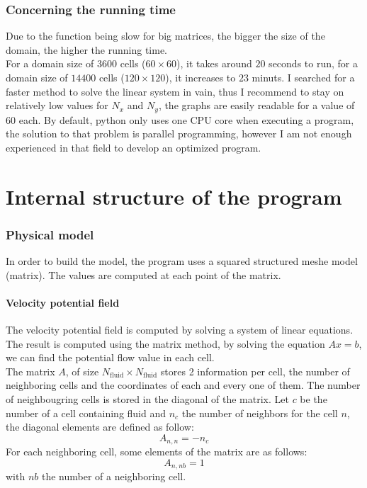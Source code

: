 \section{Concerning the running time}
Due to the function  being slow for
big matrices, the bigger the size of the domain, the higher the running time.\\
For a domain size of $\num{3600}$ cells ($\num{60} \times \num{60}$), it takes
around $\num{20}$ seconds to run, for a domain size of $\num{14400}$ cells
($\num{120} \times \num{120}$), it increases to $\num{23}$ minuts. 
\smallbreak{}
I searched for a faster method to solve the linear system in vain, thus I
recommend to stay on relatively low values for $N_x$ and $N_y$, the graphs are
easily readable for a value of $\num{60}$ each.
\smallbreak{}
By default, python only uses one CPU core when executing a program, the
solution to that problem is parallel programming, however I am not enough
experienced in that field to develop an optimized program.

\part{Internal structure of the program}
\section{Physical model}
In order to build the model, the program uses a squared structured meshe
model (matrix). The values are computed at each point of the matrix.

\subsection{Velocity potential field}
The velocity potential field is computed by solving a system of linear
equations. The result is computed using the matrix method, by solving the
equation $Ax = b$, we can find the potential flow value in each cell.\\
The matrix $A$, of size $N_\text{fluid} \times N_\text{fluid}$ stores 2
information per cell, the number of neighboring cells and the coordinates of
each and every one of them. The number of neighbougring cells is stored in the
diagonal of the matrix. Let $c$ be the number of a cell containing fluid and
$n_c$ the number of neighbors for the cell $n$, the diagonal elements are
defined as follow:
\[
      A_{n, n} = -n_c
\]
For each neighboring cell, some elements of the matrix are as follows:
\[
      A_{n, nb} = 1
\]
with $nb$ the number of a neighboring cell.
